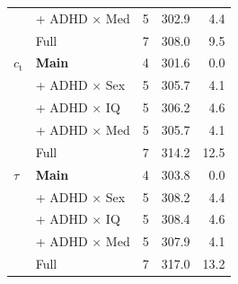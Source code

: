 \begin{longtable}{l l c r r}
         & + ADHD $\times$ Med & 5 & 302.9 & 4.4 \\
         & Full & 7 & 308.0 & 9.5 \\
        \midrule
        $c_{\text{t}}$ & \textbf{Main} & 4 & 301.6 & 0.0 \\
         & + ADHD $\times$ Sex & 5 & 305.7 & 4.1 \\
         & + ADHD $\times$ IQ & 5 & 306.2 & 4.6 \\
         & + ADHD $\times$ Med & 5 & 305.7 & 4.1 \\
         & Full & 7 & 314.2 & 12.5 \\
        \midrule
        $\tau$ & \textbf{Main} & 4 & 303.8 & 0.0 \\
         & + ADHD $\times$ Sex & 5 & 308.2 & 4.4 \\
         & + ADHD $\times$ IQ & 5 & 308.4 & 4.6 \\
         & + ADHD $\times$ Med & 5 & 307.9 & 4.1 \\
         & Full & 7 & 317.0 & 13.2 \\
    \end{longtable}
\endgroup